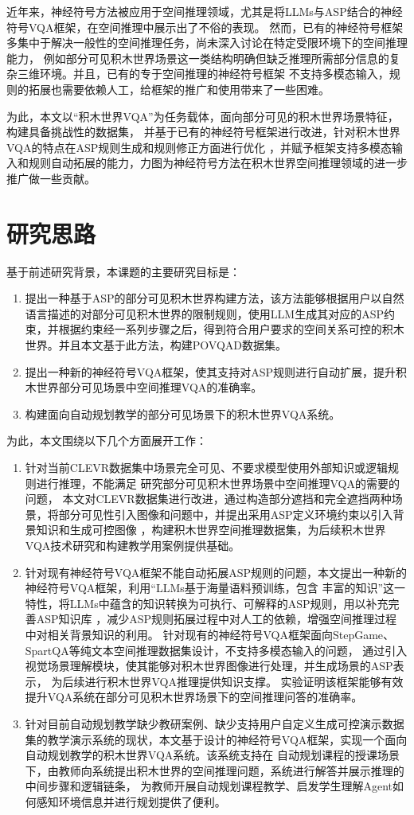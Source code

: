 近年来，神经符号方法被应用于空间推理领域，尤其是将LLMs与ASP结合的神经符号VQA框架，在空间推理中展示出了不俗的表现。
然而，已有的神经符号框架多集中于解决一般性的空间推理任务，尚未深入讨论在特定受限环境下的空间推理能力，
例如部分可见积木世界场景这一类结构明确但缺乏推理所需部分信息的复杂三维环境。并且，已有的专于空间推理的神经符号框架
\cite{wang2024dspy}不支持多模态输入，规则的拓展也需要依赖人工，给框架的推广和使用带来了一些困难。

为此，本文以“积木世界VQA”为任务载体，面向部分可见的积木世界场景特征，构建具备挑战性的数据集，
并基于已有的神经符号框架进行改进，针对积木世界VQA的特点在ASP规则生成和规则修正方面进行优化
，并赋予框架支持多模态输入和规则自动拓展的能力，力图为神经符号方法在积木世界空间推理领域的进一步推广做一些贡献。
\section{研究思路}
基于前述研究背景，本课题的主要研究目标是：
\begin{enumerate}[nosep]
\item 提出一种基于ASP的部分可见积木世界构建方法，该方法能够根据用户以自然语言描述的对部分可见积木世界的限制规则，使用LLM生成其对应的ASP约束，并根据约束经一系列步骤之后，得到符合用户要求的空间关系可控的积木世界。并且本文基于此方法，构建POVQAD数据集。
\item 提出一种新的神经符号VQA框架，使其支持对ASP规则进行自动扩展，提升积木世界部分可见场景中空间推理VQA的准确率。
\item 构建面向自动规划教学的部分可见场景下的积木世界VQA系统。
\end{enumerate}

为此，本文围绕以下几个方面展开工作：
\begin{enumerate}[nosep]
\item 针对当前CLEVR数据集中场景完全可见、不要求模型使用外部知识或逻辑规则进行推理，不能满足
研究部分可见积木世界场景中空间推理VQA的需要的问题，
本文对CLEVR数据集进行改进，通过构造部分遮挡和完全遮挡两种场景，将部分可见性引入图像和问题中，并提出采用ASP定义环境约束以引入背景知识和生成可控图像
，构建积木世界空间推理数据集，为后续积木世界VQA技术研究和构建教学用案例提供基础。
\item 针对现有神经符号VQA框架不能自动拓展ASP规则的问题，本文提出一种新的神经符号VQA框架，利用“LLMs基于海量语料预训练，包含
丰富的知识”这一特性，将LLMs中蕴含的知识转换为可执行、可解释的ASP规则，用以补充完善ASP知识库
，减少ASP规则拓展过程中对人工的依赖，增强空间推理过程中对相关背景知识的利用。
针对现有的神经符号VQA框架面向StepGame、SpartQA等纯文本空间推理数据集设计，不支持多模态输入的问题，
通过引入视觉场景理解模块，使其能够对积木世界图像进行处理，并生成场景的ASP表示，
为后续进行积木世界VQA推理提供知识支撑。
实验证明该框架能够有效提升VQA系统在部分可见积木世界场景下的空间推理问答的准确率。
\item 针对目前自动规划教学缺少教研案例、缺少支持用户自定义生成可控演示数据集的教学演示系统的现状，本文基于设计的神经符号VQA框架，实现一个面向自动规划教学的积木世界VQA系统。该系统支持在
自动规划课程的授课场景下，由教师向系统提出积木世界的空间推理问题，系统进行解答并展示推理的中间步骤和逻辑链条，
为教师开展自动规划课程教学、启发学生理解Agent如何感知环境信息并进行规划提供了便利。
\end{enumerate}

